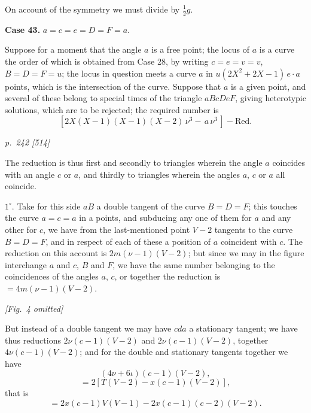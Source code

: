 \documentclass[11pt,a4paper]{book}
\begin{document}
On account of the symmetry we must divide by $\frac{1}{2}g$.

\textbf{Case 43.}  $a=c=e=D=F=a$.

Suppose for a moment that the angle $a$ is a free point; the locus of $a$ is a curve
the order of which is obtained from Case 28, by writing $c=e=v=v$, $B=D=F=u$;  the
locus in question meets a curve $a$ in $u (2X^2 + 2X - 1)\,e\cdot a$ points, which is the
intersection of the curve.  Suppose that $a$ is a given point, and several of these belong to
special times of the triangle $aBcDeF$, giving heterotypic solutions, which are to be
rejected; the required number is
\[
[2X(X-1)(X-1)(X-2)\,\nu^3-\,a\,\nu^3\,]-\text{Red.}
\]

\clearpage
\clearpage




\bigskip
\textit{p.~242 [514]}
\smallskip

The reduction is thus first and secondly to triangles wherein the angle $a$ coincides
with an angle $c$ or $a$, and thirdly to triangles wherein the angles $a$, $c$ or $a$ all coincide.

$1^{\circ}$.  Take for this side $a B$ a double tangent of the curve $B = D = F$; this touches
the curve $a = c = a$ in a points, and subducing any one of them for $a$ and any other for $c$,
we have from the last-mentioned point $V - 2$ tangents to the curve $B = D = F$, and
in respect of each of these a position of $a$ coincident with $c$.  The reduction on this
account is $2m(\nu - 1)(V - 2)$; but since we may in the figure interchange $a$ and $c$,
$B$ and $F$, we have the same number belonging to the coincidences of the angles $a$, $c$,
or together the reduction is $= 4m(\nu - 1)(V - 2)$.

\begin{center}
\textit{[Fig.~4 omitted]}
\end{center}

But instead of a double tangent we may have $c d a$ a stationary tangent; we have
thus reductions $2\nu(c - 1)(V - 2)$ and $2\nu(c - 1)(V - 2)$, together $4\nu(c - 1)(V - 2)$;
and for the double and stationary tangents together we have
\[
(4\nu + 6\iota)(c - 1)(V - 2),
\]
\[
= 2[T(V - 2) - x(c - 1)(V - 2)],
\]
that is
\[
= 2x(c - 1)V(V - 1) - 2x(c - 1)(c - 2)(V - 2).
\]
\end{document}
